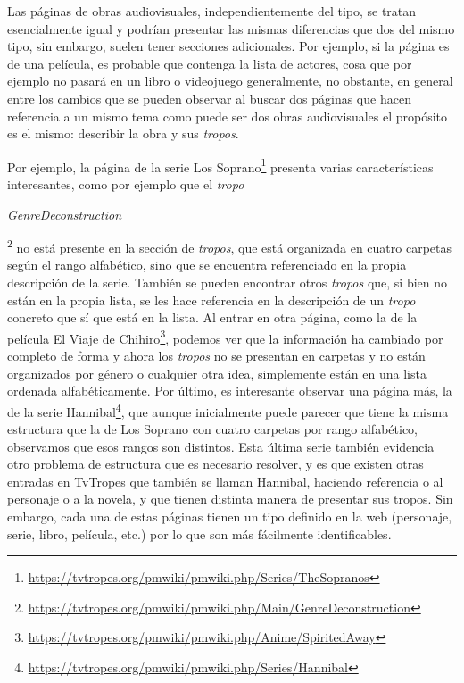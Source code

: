 Las páginas de obras audiovisuales, independientemente del tipo, se tratan
esencialmente igual y podrían presentar las mismas diferencias que dos del mismo
tipo, sin embargo, suelen tener secciones adicionales. Por ejemplo, si la página
es de una película, es probable que contenga la lista de actores, cosa que por
ejemplo no pasará en un libro o videojuego generalmente, no obstante, en general
entre los cambios que se pueden observar al buscar dos páginas que hacen
referencia a un mismo tema como puede ser dos obras audiovisuales el propósito
es el mismo: describir la obra y sus \textit{tropos}.

Por ejemplo, la página de la serie Los
Soprano\footnote{\url{https://tvtropes.org/pmwiki/pmwiki.php/Series/TheSopranos}}
presenta varias características interesantes, como por ejemplo que el
\textit{tropo}
\begin{otherlanguage}{english}\textit{GenreDeconstruction}\end{otherlanguage}\footnote{\url{https://tvtropes.org/pmwiki/pmwiki.php/Main/GenreDeconstruction}}
no está presente en la sección de \textit{tropos}, que está organizada en cuatro
carpetas según el rango alfabético, sino que se encuentra referenciado en la
propia descripción de la serie. También se pueden encontrar otros
\textit{tropos} que, si bien no están en la propia lista, se les hace referencia
en la descripción de un \textit{tropo} concreto que sí que está en la lista. Al
entrar en otra página, como la de la película El Viaje de
Chihiro\footnote{\url{https://tvtropes.org/pmwiki/pmwiki.php/Anime/SpiritedAway}},
podemos ver que la información ha cambiado por completo de forma y ahora los
\textit{tropos} no se presentan en carpetas y no están organizados por género o
cualquier otra idea, simplemente están en una lista ordenada alfabéticamente.
Por último, es interesante observar una página más, la de la serie
Hannibal\footnote{\url{https://tvtropes.org/pmwiki/pmwiki.php/Series/Hannibal}},
que aunque inicialmente puede parecer que tiene la misma estructura que la de
Los Soprano con cuatro carpetas por rango alfabético, observamos que esos rangos
son distintos. Esta última serie también evidencia otro problema de estructura
que es necesario resolver, y es que existen otras entradas en TvTropes que
también se llaman Hannibal, haciendo referencia o al personaje o a la novela, y
que tienen distinta manera de presentar sus tropos. Sin embargo, cada una de
estas páginas tienen un tipo definido en la web (personaje, serie, libro,
película, etc.) por lo que son más fácilmente identificables.

